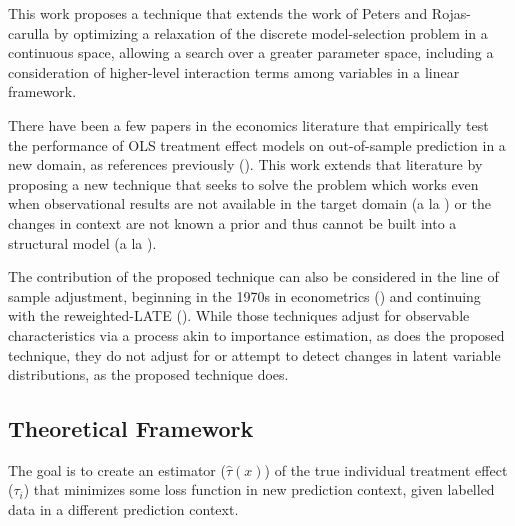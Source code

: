 \documentclass[a4paper,12pt]{article}
\begin{document}
This work proposes a technique that extends the work of Peters \parencite*{Peters2017} and Rojas-carulla \parencite*{Rojas-carulla2018} by optimizing a relaxation of the discrete model-selection problem in a continuous space, allowing a search over a greater parameter space, including a consideration of higher-level interaction terms among variables in a linear framework.

There have been a few papers in the economics literature that empirically test the performance of OLS treatment effect models on out-of-sample prediction in a new domain, as references previously (\cite{Pritchett2016, Rosenzweig2019}). This work extends that literature by proposing a new technique that seeks to solve the problem which works even when observational results are not available in the target domain (a la \cite{Pritchett2016}) or the changes in context are not known a prior and thus cannot be built into a structural model (a la \cite{Rosenzweig2019}).

The contribution of the proposed technique can also be considered in the line of sample adjustment, beginning in the 1970s in econometrics (\cite{Manski1977}) and continuing with the reweighted-LATE (\cite{Angrist2011}). While those techniques adjust for observable characteristics via a process akin to importance estimation, as does the proposed technique, they do not adjust for or attempt to detect changes in latent variable distributions, as the proposed technique does.


\subsection{ Theoretical Framework }

The goal is to create an estimator ($\hat{\tau}(x)$) of the true individual treatment effect ($\tau_i$) that minimizes some loss function in new prediction context, given labelled data in a different prediction context.
\end{document}
